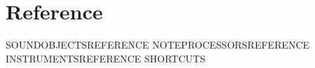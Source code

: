 \section{Reference}\label{reference}

SOUNDOBJECTSREFERENCE NOTEPROCESSORSREFERENCE INSTRUMENTSREFERENCE
SHORTCUTS
